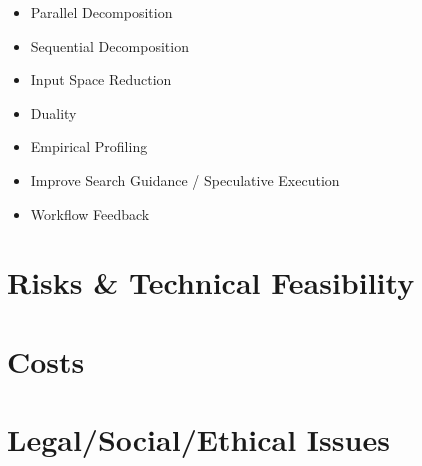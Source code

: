 \documentclass[11pt]{article}
\begin{document}
\begin{itemize}
  \item Parallel Decomposition
  \item Sequential Decomposition
  \item Input Space Reduction
  \item Duality
  \item Empirical Profiling
  \item Improve Search Guidance / Speculative Execution
  \item Workflow Feedback
\end{itemize}

\section{Risks & Technical Feasibility}


\section{Costs}

\section{Legal/Social/Ethical Issues}

\end{document}
